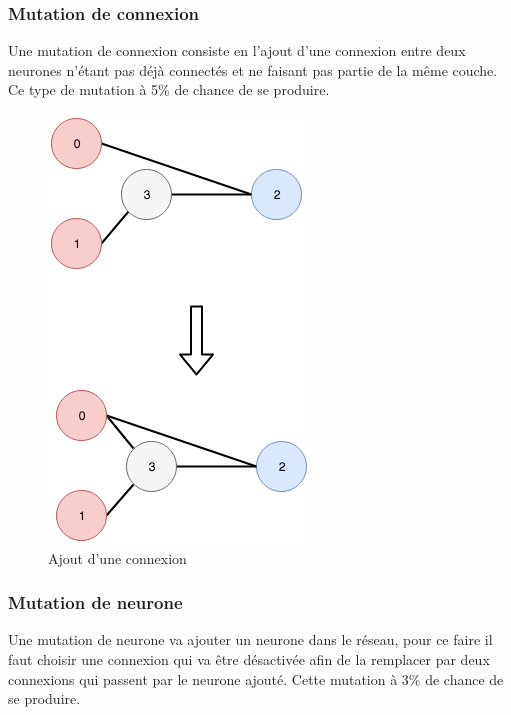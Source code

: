 \documentclass{article}
\begin{document}
\subsubsection{Mutation de connexion}

Une mutation de connexion consiste en l'ajout d'une connexion entre deux neurones n'étant pas déjà connectés et ne faisant pas partie de la même couche. Ce type de mutation à 5\% de chance de se produire.

\begin{figure}[H]
\begin{center}
	\includegraphics[scale=0.4]{addlink.png}
	\caption{Ajout d'une connexion}
\end{center}
\end{figure}

\subsubsection{Mutation de neurone}

Une mutation de neurone va ajouter un neurone dans le réseau, pour ce faire il faut choisir une connexion qui va être désactivée afin de la remplacer par deux connexions qui passent par le neurone ajouté. Cette mutation à 3\% de chance de se produire.
\end{document}
